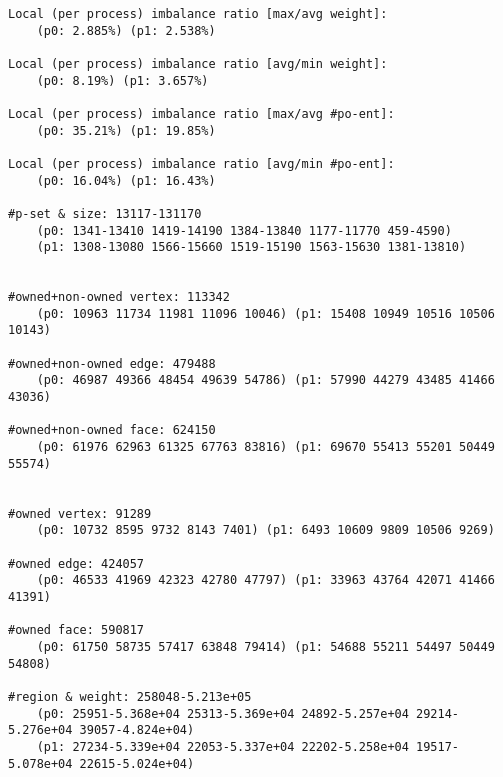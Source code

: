 \begin{small}
\begin{verbatim}
Local (per process) imbalance ratio [max/avg weight]:
	(p0: 2.885%) (p1: 2.538%) 

Local (per process) imbalance ratio [avg/min weight]: 
	(p0: 8.19%) (p1: 3.657%) 

Local (per process) imbalance ratio [max/avg #po-ent]:
	(p0: 35.21%) (p1: 19.85%) 

Local (per process) imbalance ratio [avg/min #po-ent]: 
	(p0: 16.04%) (p1: 16.43%) 

#p-set & size: 13117-131170
	(p0: 1341-13410 1419-14190 1384-13840 1177-11770 459-4590) 
    (p1: 1308-13080 1566-15660 1519-15190 1563-15630 1381-13810) 
	

#owned+non-owned vertex: 113342
	(p0: 10963 11734 11981 11096 10046) (p1: 15408 10949 10516 10506 10143) 
	
#owned+non-owned edge: 479488
	(p0: 46987 49366 48454 49639 54786) (p1: 57990 44279 43485 41466 43036) 
	
#owned+non-owned face: 624150
	(p0: 61976 62963 61325 67763 83816) (p1: 69670 55413 55201 50449 55574) 
	

#owned vertex: 91289
	(p0: 10732 8595 9732 8143 7401) (p1: 6493 10609 9809 10506 9269) 
	
#owned edge: 424057
	(p0: 46533 41969 42323 42780 47797) (p1: 33963 43764 42071 41466 41391) 
	
#owned face: 590817
	(p0: 61750 58735 57417 63848 79414) (p1: 54688 55211 54497 50449 54808) 
	
#region & weight: 258048-5.213e+05
	(p0: 25951-5.368e+04 25313-5.369e+04 24892-5.257e+04 29214-5.276e+04 39057-4.824e+04)
    (p1: 27234-5.339e+04 22053-5.337e+04 22202-5.258e+04 19517-5.078e+04 22615-5.024e+04)
\end{verbatim}
\end{small}

